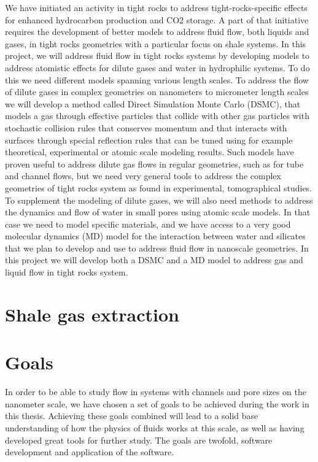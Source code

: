 We have initiated an activity in tight rocks to address tight-rocks-specific effects for enhanced hydrocarbon production and CO2 storage. A part of that initiative requires the development of better models to address fluid flow, both liquids and gases, in tight rocks geometries with a particular focus on shale systems. In this project, we will address fluid flow in tight rocks systems by developing models to address atomistic effects for dilute gases and water in hydrophilic systems. To do this we need different models spanning various length scales. To address the flow of dilute gases in complex geometries on nanometers to micrometer length scales we will develop a method called Direct Simulation Monte Carlo (DSMC), that models a gas through effective particles that collide with other gas particles with stochastic collision rules that conserves momentum and that interacts with surfaces through special reflection rules that can be tuned using for example theoretical, experimental or atomic scale modeling results. Such models have proven useful to address dilute gas flows in regular geometries, such as for tube and channel flows, but we need very general tools to address the complex geometries of tight rocks system as found in experimental, tomographical studies. To supplement the modeling of dilute gases, we will also need methods to address the dynamics and flow of water in small pores using atomic scale models. In that case we need to model specific materials, and we have access to a very good molecular dynamics (MD) model for the interaction between water and silicates that we plan to develop and use to address fluid flow in nanoscale geometries.
In this project we will develop both a DSMC and a MD model to address gas and liquid flow in tight rocks system.
\section{Shale gas extraction}


\section{Goals}
\renewcommand{\thesubsection}{\thesection.\alph{subsection}}
In order to be able to study flow in systems with channels and pore sizes on the nanometer scale, we have chosen a set of goals to be achieved during the work in this thesis. Achieving these goals combined will lead to a solid base understanding of how the physics of fluids works at this scale, as well as having developed great tools for further study. The goals are twofold, software development and application of the software. 
